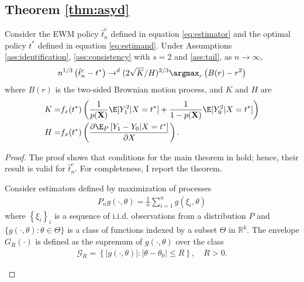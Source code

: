 {\subsection*{Theorem \ref{thm:asyd}}
\begin{thm}
Consider the EWM policy $\hat{t}^e_n$ defined in equation \eqref{eq:estimator} and the optimal policy $t^*$ defined in equation \eqref{eq:estimand}. Under Assumptions \ref{ass:identification}, \ref{ass:consistency} with $s=2$ and \ref{ass:tail}, as $n\rightarrow \infty$,
\begin{gather}
    n^{1 / 3}\left(\hat{t}^e_n-t^*\right) \rightarrow^d (2\sqrt{K}/H)^{2/3}\argmax_r \left(B(r) - r^2 \right)
\end{gather}
where $B(r)$ is the two-sided Brownian motion process, and $K$ and $H$ are
\begin{align*}
    K
    =& f_x(t^*) \left(\frac{1}{p(\textbf{X})} \E[Y_1^2|X = t^*] + \frac{1}{1-p(\textbf{X})} \E[Y_0^2|X = t^*] \right) \\
    H =&  f_x(t^*) \left(\frac{\partial \E_P\left[Y_1 - Y_0 | X = t^* \right]}{\partial X} \right).
\end{align*}
\end{thm}
\begin{proof}
The proof shows that conditions for the main theorem in \cite{kim1990cube} hold; hence, their result is valid for $\hat{t}^e_n$. For completeness, I report the theorem.

\begin{thmkp} \label{thm:kp}
Consider estimators defined by maximization of processes
\begin{gather}
    P_n g(\cdot, \theta)=\frac{1}{n} \sum_{i=1}^n g\left(\xi_i, \theta\right)
\end{gather}
where $\left\{\xi_i\right\}_i$ is a sequence of i.i.d. observations from a distribution $P$ and $\{g(\cdot, \theta): \theta \in \Theta\}$ is a class of functions indexed by a subset $\Theta$ in $\mathbb{R}^k$. The envelope $G_R(\cdot)$ is defined as the supremum of $g(\cdot, \theta)$ over the class
\begin{gather}
    \mathcal{G}_R=\left\{|g(\cdot, \theta)|:\left|\theta-\theta_0\right| \leq R\right\}, \quad R>0.
\end{gather}


\end{thmkp}
\end{proof}}
